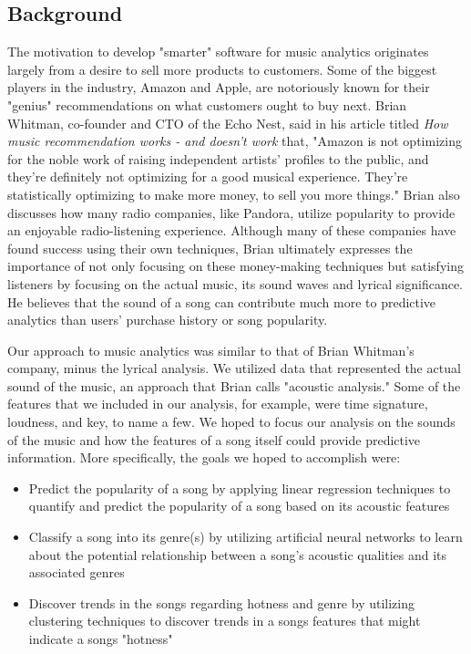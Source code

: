 \documentclass[12pt]{article}
\begin{document}
\subsection{Background}
\label{subsec:background}
The motivation to develop "smarter" software for music analytics originates largely from a desire to sell more products to customers. Some of the biggest players in the industry, Amazon and Apple, are notoriously known for their "genius" recommendations on what customers ought to buy next. Brian Whitman, co-founder and CTO of the Echo Nest, said in his article titled \textit{How music recommendation works - and doesn't work} that, "Amazon is not optimizing for the noble work of raising independent artists' profiles to the public, and they're definitely not optimizing for a good musical experience. They're statistically optimizing to make more money, to sell you more things." Brian also discusses how many radio companies, like Pandora, utilize popularity to provide an enjoyable radio-listening experience. Although many of these companies have found success using their own techniques, Brian ultimately expresses the importance of not only focusing on these money-making techniques but satisfying listeners by focusing on the actual music, its sound waves and lyrical significance. He believes that the sound of a song can contribute much more to predictive analytics than users' purchase history or song popularity.

Our approach to music analytics was similar to that of Brian Whitman's company, minus the lyrical analysis. We utilized data that represented the actual sound of the music, an approach that Brian calls "acoustic analysis." Some of the features that we included in our analysis, for example, were time signature, loudness, and key, to name a few. We hoped to focus our analysis on the sounds of the music and how the features of a song itself could provide predictive information. More specifically, the goals we hoped to accomplish were:
\vspace{-3.5mm}
\begin{itemize}
    \item Predict the popularity of a song by applying linear regression techniques to quantify and predict the popularity of a song based on its acoustic features
    \vspace{-3.5mm}
    \item Classify a song into its genre(s) by utilizing artificial neural networks to learn about the potential relationship between a song's acoustic qualities and its associated genres 
    \vspace{-3.5mm}
    \item Discover trends in the songs regarding hotness and genre by utilizing clustering techniques to discover trends in a songs features that might indicate a songs "hotness"
    \vspace{-3.5mm}
\end{itemize}
\end{document}

